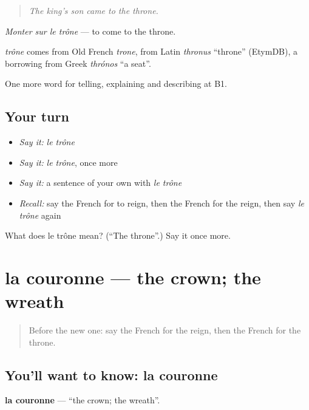 \begin{quote}
\emph{The king's son came to the throne.}
\end{quote}

\emph{Monter sur le trône} — to come to the throne.

\begin{cousinweb}
\emph{trône} comes from Old French \emph{trone}, from Latin \emph{thronus} \textquotedblleft{}throne\textquotedblright{} (EtymDB), a borrowing from Greek \emph{thrónos} \textquotedblleft{}a seat\textquotedblright{}.
\end{cousinweb}

\begin{grammarlens}[title={What you've built}]
One more word for telling, explaining and describing at B1.
\end{grammarlens}

\subsection*{Your turn}
\begin{itemize}
\raggedright
  \item \emph{Say it:} \emph{le trône}
  \item \emph{Say it:} \emph{le trône}, once more
  \item \emph{Say it:} a sentence of your own with \emph{le trône}
  \item \emph{Recall:} say the French for to reign, then the French for the reign, then say \emph{le trône} again
\end{itemize}

\begin{tcolorbox}[breakable,colback=teal!4,colframe=teal!35!black,title={Before you move on}]
What does le trône mean? (\textquotedblleft{}The throne\textquotedblright{}.) Say it once more.
\end{tcolorbox}
\section[la couronne]{la couronne — the crown; the wreath}

\label{lesson:FR-C323-couronne}



\begin{quote}
Before the new one: say the French for the reign, then the French for the throne.
\end{quote}

\subsection*{You'll want to know: la couronne}
\textbf{la couronne} — \textquotedblleft{}the crown; the wreath\textquotedblright{}.

